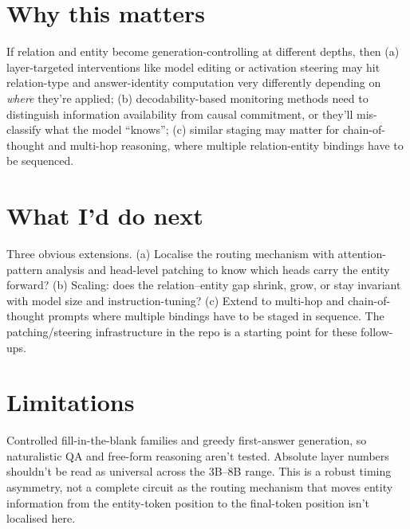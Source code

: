 \documentclass[10pt]{article}
\begin{document}
\section*{Why this matters}

If relation and entity become generation-controlling at different depths, then (a) layer-targeted interventions like model editing or activation steering may hit relation-type and answer-identity computation very differently depending on \emph{where} they're applied; (b) decodability-based monitoring methods need to distinguish information availability from causal commitment, or they'll mis-classify what the model ``knows''; (c) similar staging may matter for chain-of-thought and multi-hop reasoning, where multiple relation-entity bindings have to be sequenced.

\section*{What I'd do next}

Three obvious extensions. (a) Localise the routing mechanism with attention-pattern analysis and head-level patching to know which heads carry the entity forward? (b) Scaling: does the relation--entity gap shrink, grow, or stay invariant with model size and instruction-tuning? (c) Extend to multi-hop and chain-of-thought prompts where multiple bindings have to be staged in sequence. The patching/steering infrastructure in the repo is a starting point for these follow-ups.

\section*{Limitations}

Controlled fill-in-the-blank families and greedy first-answer generation, so naturalistic QA and free-form reasoning aren't tested. Absolute layer numbers shouldn't be read as universal across the 3B--8B range. This is a robust timing asymmetry, not a complete circuit as the routing mechanism that moves entity information from the entity-token position to the final-token position isn't localised here.
\end{document}
